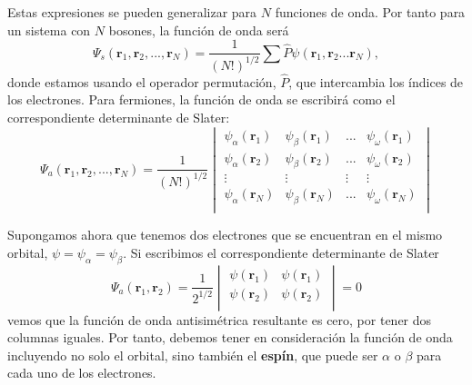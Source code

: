Estas expresiones se pueden generalizar para $N$ funciones de onda.
Por tanto para un sistema con $N$ bosones, la función de onda 
será
\begin{equation}
    \Psi_s(\mathbf{r}_1,\mathbf{r}_2, ..., \mathbf{r}_N) = \frac{1}{(N!)^{1/2}}
    \sum\hat{P}\psi(\mathbf{r}_1,\mathbf{r}_2 ... \mathbf{r}_N),
\end{equation}
donde estamos usando el operador permutación, $\hat{P}$, que
intercambia los índices de los electrones.
Para fermiones, la función de onda se escribirá como
el correspondiente determinante de Slater:
\begin{equation}
    \Psi_a(\mathbf{r}_1,\mathbf{r}_2, ..., \mathbf{r}_N) = \frac{1}{(N!)^{1/2}}
    \begin{vmatrix} 
    \psi_\alpha(\mathbf{r}_1) & \psi_\beta(\mathbf{r}_1) & ... & \psi_\omega(\mathbf{r}_1)  \\
    \psi_\alpha(\mathbf{r}_2) & \psi_\beta(\mathbf{r}_2) & ... & \psi_\omega(\mathbf{r}_2)  \\
    \vdots & \vdots & \vdots& \vdots\\
    \psi_\alpha(\mathbf{r}_N) & \psi_\beta(\mathbf{r}_N) & ... & \psi_\omega(\mathbf{r}_N)  \\
    \end{vmatrix}
\end{equation}

 
Supongamos ahora que tenemos dos electrones que se encuentran en el mismo
orbital, $\psi=\psi_\alpha = \psi_\beta$. Si escribimos el 
correspondiente determinante de Slater 
\begin{equation}
    \Psi_a(\mathbf{r}_1,\mathbf{r}_2) = \frac{1}{2^{1/2}}
    \begin{vmatrix} 
    \psi(\mathbf{r}_1) & \psi(\mathbf{r}_1)   \\
    \psi(\mathbf{r}_2) & \psi(\mathbf{r}_2)  \\
    \end{vmatrix}=0
\end{equation}
vemos que la función de onda antisimétrica resultante 
es cero, por tener dos columnas iguales. Por tanto, 
debemos tener en consideración
la función de onda incluyendo no solo el orbital,
sino también el \textbf{espín}, que puede ser $\alpha$
o $\beta$ para cada uno de los electrones. 


